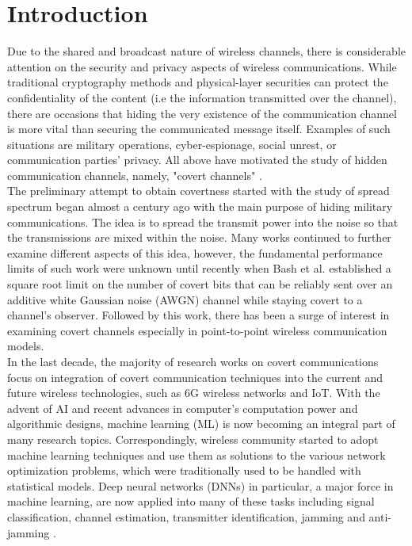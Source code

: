 \section{Introduction}
\label{s:intro}

Due to the shared and broadcast nature of wireless channels, there is considerable attention on the security and privacy aspects of wireless communications. While traditional cryptography methods and physical-layer securities can protect the confidentiality of the content (i.e the information transmitted over the channel), there are occasions that hiding the very existence of the communication channel is more vital than securing the communicated message itself. Examples of such situations are military operations, cyber-espionage, social unrest, or communication parties' privacy. All above have motivated the study of hidden communication channels, namely, "covert channels" \cite{lampson1973note}.\\
The preliminary attempt to obtain covertness started with the study of spread spectrum began almost a century ago with the main purpose of hiding military communications. The idea is to spread the transmit power into the noise so that the transmissions are mixed within the noise. Many works continued to further examine different aspects of this idea, however, the fundamental performance limits of such work were unknown until recently when Bash et al. \cite{bash2012square} established a square root limit on the number of covert bits that can be reliably sent over an additive white Gaussian noise (AWGN) channel while staying covert to a channel's observer. Followed by this work, there has been a surge of interest in examining covert channels \cite{sobers2017covert,soltani2018covert} especially in point-to-point wireless communication models.\\
In the last decade, the majority of research works on covert communications focus on integration of covert communication techniques into the current and future wireless technologies, such as 6G wireless networks and IoT. With the advent of AI and recent advances in computer's computation power and algorithmic designs, machine learning (ML) is now becoming an integral part of many research topics. Correspondingly, wireless community started to adopt machine learning techniques and use them as solutions to the various network optimization problems, which were traditionally used to be handled with statistical models. Deep neural networks (DNNs) in particular, a major force in machine learning, are now applied into many of these tasks including signal classification, channel estimation, transmitter identification, jamming and anti-jamming \cite{bahramali2021robust}.\\
